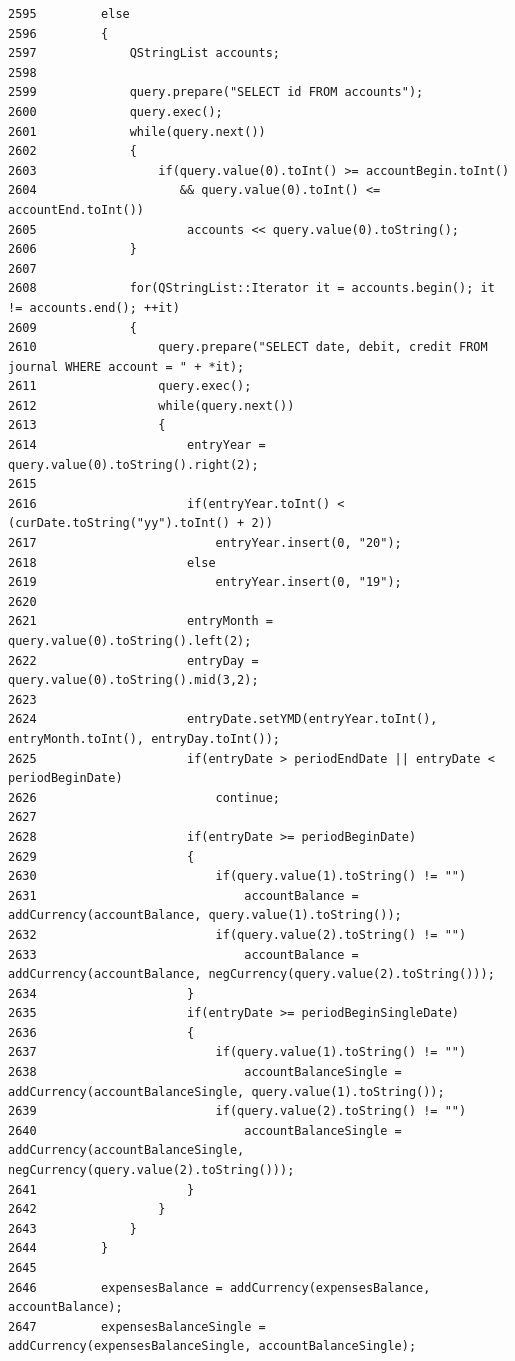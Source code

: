 \begin{verbatim}
2595         else
2596         {
2597             QStringList accounts;
2598 
2599             query.prepare("SELECT id FROM accounts");
2600             query.exec();
2601             while(query.next())
2602             {
2603                 if(query.value(0).toInt() >= accountBegin.toInt()
2604                    && query.value(0).toInt() <= accountEnd.toInt())
2605                     accounts << query.value(0).toString();
2606             }
2607 
2608             for(QStringList::Iterator it = accounts.begin(); it != accounts.end(); ++it)
2609             {
2610                 query.prepare("SELECT date, debit, credit FROM journal WHERE account = " + *it);
2611                 query.exec();
2612                 while(query.next())
2613                 {
2614                     entryYear = query.value(0).toString().right(2);
2615 
2616                     if(entryYear.toInt() < (curDate.toString("yy").toInt() + 2))
2617                         entryYear.insert(0, "20");
2618                     else
2619                         entryYear.insert(0, "19");
2620 
2621                     entryMonth = query.value(0).toString().left(2);
2622                     entryDay = query.value(0).toString().mid(3,2);
2623 
2624                     entryDate.setYMD(entryYear.toInt(), entryMonth.toInt(), entryDay.toInt());
2625                     if(entryDate > periodEndDate || entryDate < periodBeginDate)
2626                         continue;
2627 
2628                     if(entryDate >= periodBeginDate)
2629                     {
2630                         if(query.value(1).toString() != "")
2631                             accountBalance = addCurrency(accountBalance, query.value(1).toString());
2632                         if(query.value(2).toString() != "")
2633                             accountBalance = addCurrency(accountBalance, negCurrency(query.value(2).toString()));
2634                     }
2635                     if(entryDate >= periodBeginSingleDate)
2636                     {
2637                         if(query.value(1).toString() != "")
2638                             accountBalanceSingle = addCurrency(accountBalanceSingle, query.value(1).toString());
2639                         if(query.value(2).toString() != "")
2640                             accountBalanceSingle = addCurrency(accountBalanceSingle, negCurrency(query.value(2).toString()));
2641                     }
2642                 }
2643             }
2644         }
2645 
2646         expensesBalance = addCurrency(expensesBalance, accountBalance);
2647         expensesBalanceSingle = addCurrency(expensesBalanceSingle, accountBalanceSingle);

\end{verbatim}
